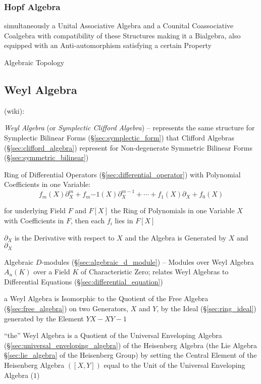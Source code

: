 {{\subsubsection{Hopf Algebra}\label{sec:hopf_algebra}

simultaneously a Unital Associative Algebra and a Counital
Coassociative Coalgebra with compatibility of these Structures making
it a Bialgebra, also equipped with an Anti-automorphism satisfying a
certain Property %

Algebraic Topology



\subsection{Weyl Algebra}\label{sec:weyl_algebra}

(wiki):

\emph{Weyl Algebra} (or \emph{Symplectic Clifford Algebra}) -- represents the
same structure for Symplectic Bilinear Forms (\S\ref{sec:symplectic_form}) that
Clifford Algebras (\S\ref{sec:clifford_algebra}) represent for Non-degenerate
Symmetric Bilinear Forms (\S\ref{sec:symmetric_bilinear})

Ring of Differential Operators (\S\ref{sec:differential_operator}) with
Polynomial Coefficients in one Variable:
\[
  f_m(X)\partial^m_X + f_m{-1}(X)\partial^{m-1}_X + \cdots +
  f_1(X)\partial_X + f_0(X)
\]

for underlying Field $F$ and $F[X]$ the Ring of Polynomials in one Variable $X$
with Coefficients in $F$, then each $f_i$ lies in $F[X]$

$\partial_X$ is the Derivative with respect to $X$ and the Algebra is Generated
by $X$ and $\partial_X$

\fist Algebraic $D$-modules (\S\ref{sec:algebraic_d_module}) -- Modules over
Weyl Algebra $A_n(K)$ over a Field $K$ of Characteristic Zero; relates Weyl
Algebras to Differential Equations (\S\ref{sec:differential_equation})

a Weyl Algebra is Isomorphic to the Quotient of the Free Algebra
(\S\ref{sec:free_algebra}) on two Generators, $X$ and $Y$, by the Ideal
(\S\ref{sec:ring_ideal}) generated by the Element $YX - XY - 1$

``the'' Weyl Algebra is a Quotient of the Universal Enveloping Algebra
(\S\ref{sec:universal_enveloping_algebra}) of the Heisenberg Algebra (the Lie
Algebra \S\ref{sec:lie_algebra} of the Heisenberg Group) by setting the Central
Element of the Heisenberg Algebra $([X,Y])$ equal to the Unit of the Universal
Enveloping Algebra ($1$)

}}
